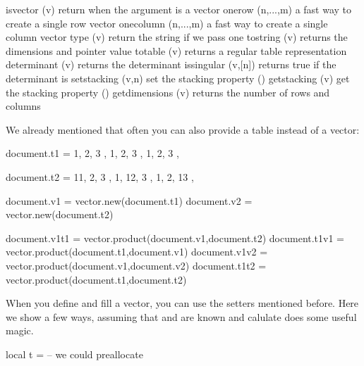 \starttabulate[|Tl|Tl|l|]
\NC isvector      \NC (v)       \NC return  when the argument is a vector \NC \NR
\NC onerow        \NC (n,...,m) \NC a fast way to create a single row vector \NC \NR
\NC onecolumn     \NC (n,...,m) \NC a fast way to create a single column vector \NC \NR
\NC type          \NC (v)       \NC return the string  if we pass one \NC \NR
\NC tostring      \NC (v)       \NC returns the dimensions and pointer value \NC \NR
\NC totable       \NC (v)       \NC returns a regular table representation \NC \NR
\NC determinant   \NC (v)       \NC returns the determinant \NC \NR
\NC issingular    \NC (v,[n])   \NC returns true if the determinant is \NC \NR
\NC setstacking   \NC (v,n)     \NC set the stacking property (\METAPOST) \NC \NR
\NC getstacking   \NC (v)       \NC get the stacking property (\METAPOST) \NC \NR
\NC getdimensions \NC (v)       \NC returns the number of rows and columns \NC \NR
\stoptabulate

We already mentioned that often you can also provide a table instead
of a vector:

\startbuffer
\startluacode
document.t1 = {
    { 1, 2, 3 },
    { 1, 2, 3 },
    { 1, 2, 3 },
}

document.t2 = {
    { 11, 2, 3 },
    { 1, 12, 3 },
    { 1, 2, 13 },
}

document.v1 = vector.new(document.t1)
document.v2 = vector.new(document.t2)

document.v1t1 = vector.product(document.v1,document.t2)
document.t1v1 = vector.product(document.t1,document.v1)
document.v1v2 = vector.product(document.v1,document.v2)
document.t1t2 = vector.product(document.t1,document.t2)
\stopluacode
\stopbuffer

\typebuffer[option=TEX] \getbuffer

\startlinecorrection
{} {}
    {} {}
    {} {}
    {} {}
\stopcombination
\stoplinecorrection

When you define and fill a vector, you can use the setters mentioned before. Here
we show a few ways, assuming that  and  are known and \type
{calulate} does some useful magic.

\starttyping[option=LUA]
local t = { }  -- we could preallocate

